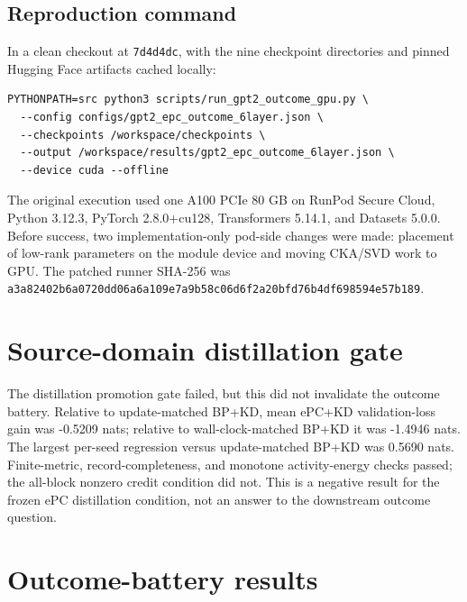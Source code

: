 \documentclass[11pt]{article}
\begin{document}
\subsection{Reproduction command}
In a clean checkout at \texttt{7d4d4dc}, with the nine checkpoint directories and pinned Hugging Face artifacts cached locally:
\begin{verbatim}
PYTHONPATH=src python3 scripts/run_gpt2_outcome_gpu.py \
  --config configs/gpt2_epc_outcome_6layer.json \
  --checkpoints /workspace/checkpoints \
  --output /workspace/results/gpt2_epc_outcome_6layer.json \
  --device cuda --offline
\end{verbatim}
The original execution used one A100 PCIe 80 GB on RunPod Secure Cloud, Python 3.12.3, PyTorch 2.8.0+cu128, Transformers 5.14.1, and Datasets 5.0.0. Before success, two implementation-only pod-side changes were made: placement of low-rank parameters on the module device and moving CKA/SVD work to GPU. The patched runner SHA-256 was {\scriptsize\texttt{a3a82402b6a0720d}\allowbreak\texttt{d06a6a109e7a9b58}\allowbreak\texttt{c06d6f2a20bfd76b}\allowbreak\texttt{4df698594e57b189}}.

\section{Source-domain distillation gate}
The distillation promotion gate failed, but this did not invalidate the outcome battery. Relative to update-matched BP+KD, mean ePC+KD validation-loss gain was -0.5209 nats; relative to wall-clock-matched BP+KD it was -1.4946 nats. The largest per-seed regression versus update-matched BP+KD was 0.5690 nats. Finite-metric, record-completeness, and monotone activity-energy checks passed; the all-block nonzero credit condition did not. This is a negative result for the frozen ePC distillation condition, not an answer to the downstream outcome question.

\section{Outcome-battery results}
\end{document}
